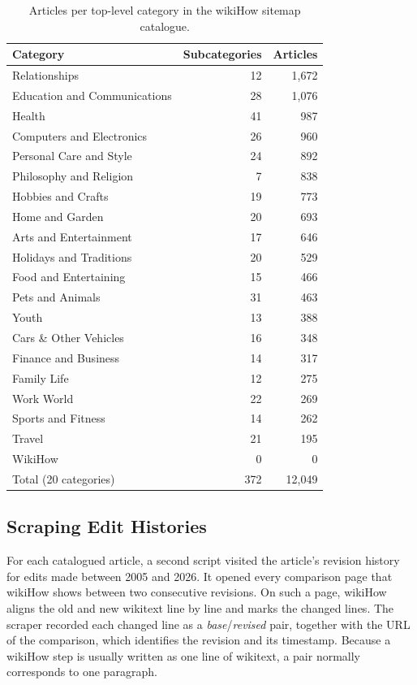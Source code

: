 \documentclass[12pt,a4paper,oneside]{report}
\begin{document}
\begin{table}[ht]
\centering
\small
\caption{Articles per top-level category in the wikiHow sitemap catalogue.}
\label{tab:categories}
\begin{tabular}{@{}lrr@{}}
\toprule
Category & Subcategories & Articles\\
\midrule
Relationships & 12 & 1{,}672\\
Education and Communications & 28 & 1{,}076\\
Health & 41 & 987\\
Computers and Electronics & 26 & 960\\
Personal Care and Style & 24 & 892\\
Philosophy and Religion & 7 & 838\\
Hobbies and Crafts & 19 & 773\\
Home and Garden & 20 & 693\\
Arts and Entertainment & 17 & 646\\
Holidays and Traditions & 20 & 529\\
Food and Entertaining & 15 & 466\\
Pets and Animals & 31 & 463\\
Youth & 13 & 388\\
Cars \& Other Vehicles & 16 & 348\\
Finance and Business & 14 & 317\\
Family Life & 12 & 275\\
Work World & 22 & 269\\
Sports and Fitness & 14 & 262\\
Travel & 21 & 195\\
WikiHow & 0 & 0\\
\midrule
Total (20 categories) & 372 & 12{,}049\\
\bottomrule
\end{tabular}
\end{table}

\subsection{Scraping Edit Histories}
For each catalogued article, a second script visited the article's revision history for edits made between 2005 and 2026. It opened every comparison page that wikiHow shows between two consecutive revisions. On such a page, wikiHow aligns the old and new wikitext line by line and marks the changed lines. The scraper recorded each changed line as a \emph{base}/\emph{revised} pair, together with the URL of the comparison, which identifies the revision and its timestamp. Because a wikiHow step is usually written as one line of wikitext, a pair normally corresponds to one paragraph.
\end{document}
